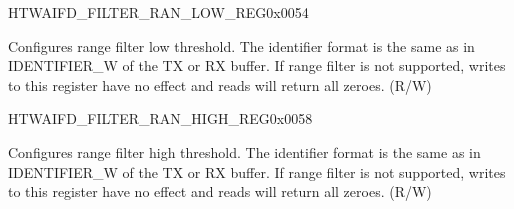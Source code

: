 \begin{register}{H}{TWAIFD\_FILTER\_RAN\_LOW\_REG}{0x0054}\label{regdesc:TWAIFDFILTERRANLOWREG}
%
%
\regnewline%
\begin{regdesc}\begin{reglist}
\label{fielddesc:TWAIFDBITRANLOWVAL}\item [TWAIFD\_BIT\_RAN\_LOW\_VAL] Configures range filter low threshold. The identifier format is the same as in IDENTIFIER\_W of the TX or RX buffer. If range filter is not supported, writes to this register have no effect and reads will return all zeroes. (R/W)
\end{reglist}\end{regdesc}
\end{register}


\begin{register}{H}{TWAIFD\_FILTER\_RAN\_HIGH\_REG}{0x0058}\label{regdesc:TWAIFDFILTERRANHIGHREG}
%
%
\regnewline%
\begin{regdesc}\begin{reglist}
\label{fielddesc:TWAIFDBITRANHIGHVAL}\item [TWAIFD\_BIT\_RAN\_HIGH\_VAL] Configures range filter high threshold. The identifier format is the same as in IDENTIFIER\_W of the TX or RX buffer. If range filter is not supported, writes to this register have no effect and reads will return all zeroes. (R/W)
\end{reglist}\end{regdesc}
\end{register}


